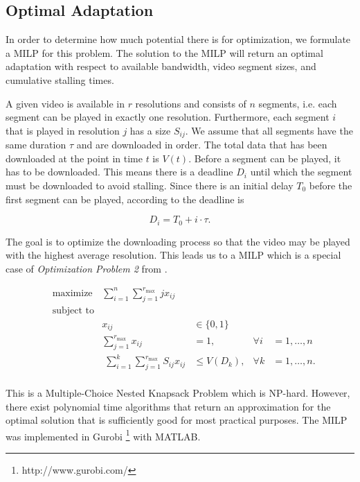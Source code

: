 \subsection{Optimal Adaptation}
\label{optadapt}

In order to determine how much potential there is for optimization, we formulate a MILP for this problem. 
The solution to the MILP will return an optimal adaptation with respect to available bandwidth, video segment sizes, and cumulative stalling times.

A given video is available in $r$ resolutions and consists of $n$ segments, i.e. each segment can be played in exactly one resolution. Furthermore, each segment $i$ that is played in resolution $j$ has a size $S_{ij}$. We assume that all segments have the same duration $\tau$ and are downloaded in order. The total data that has been downloaded at the point in time $t$ is $V(t)$. Before a segment can be played, it has to be downloaded. This means there is a deadline $D_i$ until which the segment must be downloaded to avoid stalling. Since there is an initial delay $T_0$ before the first segment can be played, according to \cite{hossfeld2015identifying} the deadline is

\begin{equation}
D_i = T_0 + i\cdot \tau.
\end{equation}

The goal is to optimize the downloading process so that the video may be played with the highest average resolution. This leads us to a MILP which is a special case of \textit{Optimization Problem 2} from \cite{hossfeld2015identifying}.

\begin{align*}
& \text{maximize} & \sum_{i = 1}^{n} \sum_{j = 1}^{r_{\text{max}}} j x_{ij} &\\
& \text{subject to} & &&\\
&& x_{ij} &\in \{0,1\} &\\
&& \sum_{j = 1}^{r_{\text{max}}} x_{ij} &= 1, &\forall i&=1,\ldots,n \\
&& \phantom{\text{.}} \sum_{i=1}^{k} \sum_{j = 1}^{r_{\text{max}}} S_{ij} x_{ij} &\leq V(D_k), &\forall k&=1,\ldots,n \text{.} \\
\end{align*}

This is a Multiple-Choice Nested Knapsack Problem which is NP-hard. However, there exist polynomial time algorithms that return an approximation for the optimal solution that is sufficiently good for most practical purposes. The MILP was implemented in Gurobi \footnote{http://www.gurobi.com/} with MATLAB.
